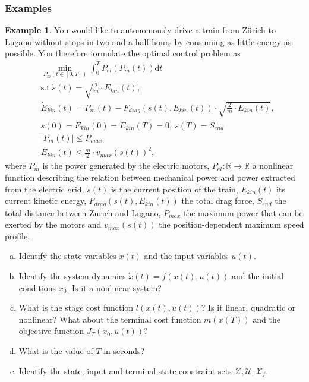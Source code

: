 \documentclass[a4paper,12 pt]{article}
\numberwithin{equation}{section}
\theoremstyle{definition}
\newtheorem{bsp}{Example}
\theoremstyle{remark}
\theoremstyle{definition}
\theoremstyle{definition}
\theoremstyle{definition}
\theoremstyle{remark}
\begin{document}
\subsubsection{Examples}
\begin{bsp}
You would like to autonomously drive a train from Z\"urich to Lugano without stops in two and a half hours by consuming as little energy as possible. You therefore formulate the optimal control problem as
\begin{equation}
\begin{split}
&\min_{P_m(t\in [0,T])}\int_0^TP_{el}(P_m(t))\text{d}t\\
&\text{s.t.}  \dot s(t)=\sqrt{\frac{2}{m}\cdot E_{kin}(t)}, \\
&\dot{E}_{kin}(t)=P_m(t)-F_{drag}(s(t),E_{kin}(t))\cdot \sqrt{\frac{2}{m}\cdot E_{kin}(t)}, \\
&s(0)=E_{kin}(0)=E_{kin}(T)=0, \ s(T)=S_{end}\\
& |P_m(t)|\leq P_{max}\\
& E_{kin}(t)\leq \frac{m}{2}\cdot v_{max}(s(t))^2,
\end{split}
\end{equation}
where $P_m$ is the power generated by the electric motors, $P_{el}:\mathbb{R}\rightarrow \mathbb{R}$ a nonlinear function describing the relation between mechanical power and power extracted from the electric grid, $s(t)$ is the current position of the train, $E_{kin}(t)$ its current kinetic energy, $F_{drag}(s(t),E_{kin}(t))$ the total drag force, $S_{end}$ the total distance between Z\"urich and Lugano, $P_{max}$ the maximum power that can be exerted by the motors and $v_{max}(s(t))$ the position-dependent maximum speed profile.
\begin{enumerate}[(a)]
\item Identify the state variables $x(t)$ and the input variables $u(t)$.
\item Identify the system dynamics $\dot{x}(t)=f(x(t),u(t))$ and the initial conditions $x_0$. Is it a nonlinear system?
\item What is the stage cost function $l(x(t),u(t))$? Is it linear, quadratic or nonlinear? What about the terminal cost function $m(x(T))$ and the objective function $J_T(x_0,u(t))$?
\item What is the value of $T$ in seconds?
\item Identify the state, input and terminal state constraint sets $\mathcal{X}, \mathcal{U}, \mathcal{X}_f$.
\end{enumerate}


\end{bsp}
\end{document}
